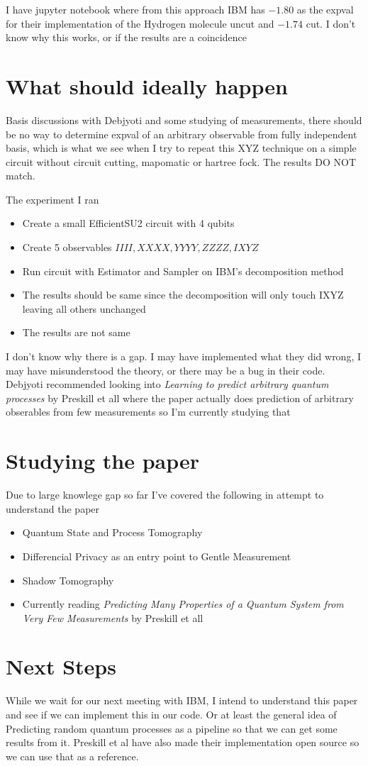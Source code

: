 \documentclass[hidelinks]{book}
\numberwithin{equation}{section}
\begin{document}
I have jupyter notebook where from this approach IBM has $-1.80$ as the expval for their implementation of the Hydrogen molecule uncut and $-1.74$ cut. I don't know why this works, or if the results are a coincidence

\section{What should ideally happen}
Basis discussions with Debjyoti and some studying of measurements, there should be no way to determine expval of an arbitrary observable from fully independent basis, which is what we see when I try to repeat this XYZ technique on a simple circuit without circuit cutting, mapomatic or hartree fock. The results DO NOT match.

The experiment I ran
\begin{itemize}
  \item Create a small EfficientSU2 circuit with 4 qubits
  \item Create 5 observables $IIII, XXXX, YYYY, ZZZZ, IXYZ$
  \item Run circuit with Estimator and Sampler on IBM's decomposition method
  \item The results should be same since the decomposition will only touch IXYZ leaving all others unchanged
  \item The results are not same
\end{itemize}

I don't know why there is a gap. I may have implemented what they did wrong, I may have misunderstood the theory, or there may be a bug in their code. Debjyoti recommended looking into \textit{Learning to predict arbitrary quantum processes} by Preskill et all where the paper actually does prediction of arbitrary obserables from few measurements so I'm currently studying that

\section{Studying the paper}
Due to large knowlege gap so far I've covered the following in attempt to understand the paper
\begin{itemize}
  \item Quantum State and Process Tomography
  \item Differencial Privacy as an entry point to Gentle Measurement
  \item Shadow Tomography
  \item Currently reading \textit{Predicting Many Properties of a Quantum System from Very Few Measurements} by Preskill et all
\end{itemize}

\section{Next Steps}
While we wait for our next meeting with IBM, I intend to understand this paper and see if we can implement this in our code. Or at least the general idea of Predicting random quantum processes as a pipeline so that we can get some results from it. Preskill et al have also made their implementation open source so we can use that as a reference.
\end{document}
